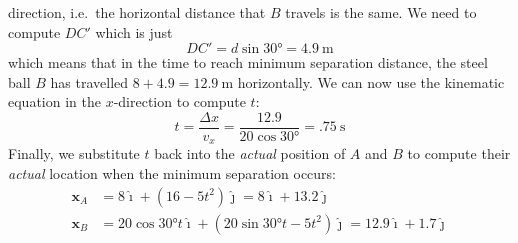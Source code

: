 \documentclass[11pt]{article}
\newcommand{\mb}[1]{\mathbf{#1}}
\newcommand{\iii}{\bm{\hat{\imath}}}
\newcommand{\jjj}{\bm{\hat{\jmath}}}
\begin{document}
direction, i.e.\ the horizontal distance that $B$ travels is the same. We
need to compute $DC'$ which is just
\begin{displaymath}
  DC'=d\sin\ang{30}=\SI{4.9}{\metre}
\end{displaymath}
which means that in the time to reach minimum separation distance, the steel
ball $B$ has travelled $8+4.9=\SI{12.9}{\metre}$ horizontally. We can now use
the kinematic equation in the $x$-direction to compute $t$:
\begin{displaymath}
  t=\frac{\Delta x}{v_x}=\frac{12.9}{20\cos\ang{30}}=\boxed{\SI{.75}{\second}}
\end{displaymath}
Finally, we substitute $t$ back into the \emph{actual} position of $A$ and $B$
to compute their \emph{actual} location when the minimum separation occurs:
\begin{align*}
  \mb{x}_A &= 8\iii + (16-5t^2)\jjj = \boxed{8\iii+13.2\jjj} \\
  \mb{x}_B &=20\cos\ang{30}t\iii+(20\sin\ang{30}t-5t^2) \jjj
  =\boxed{12.9\iii+1.7\jjj}
\end{align*}
\end{document}
